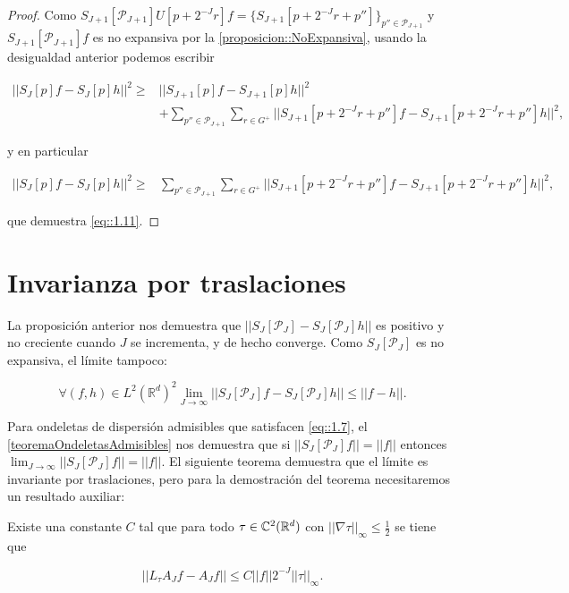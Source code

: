 \begin{proof}
\noindent Como $S_{J+1}[\mathcal{P}_{J+1}]U[p+2^{-J}r]f=\lbrace S_{J+1} [p+2^{-J}r+p'']\rbrace_{p''\in\mathcal{P}_{J+1}}$  y $S_{J+1}[\mathcal{P}_{J+1}]f$ es no expansiva por la \autoref{proposicion::NoExpansiva}, usando la desigualdad anterior podemos escribir

\begin{align*}
    ||S_{J}[p]f - S_J[p]h||^2 \geq & ||S_{J+1}[p]f-S_{J+1}[p]h||^2 \\
    & + \sum_{p''\in \mathcal{P}_{J+1}} \sum_{r\in G^+} || S_{J+1}[p+2^{-J}r+p'']f- S_{J+1}[p+2^{-J}r+p'']h||^2,
\end{align*}

\noindent y en particular

\begin{align*}
  ||S_{J}[p]f - S_J[p]h||^2 \geq & \sum_{p''\in \mathcal{P}_{J+1}} \sum_{r\in G^+} || S_{J+1}[p+2^{-J}r+p'']f- S_{J+1}[p+2^{-J}r+p'']h||^2,
\end{align*}

\noindent que demuestra \eqref{eq::1.11}. \qedhere
\end{proof}


\section{Invarianza por traslaciones}

\noindent La proposición anterior nos demuestra que $||S_J[\mathcal{P}_J]-S_J[\mathcal{P}_J]h||$ es positivo y no creciente cuando $J$ se incrementa, y de hecho converge. Como $S_J[\mathcal{P}_J]$ es no expansiva, el límite tampoco: 

$$\forall (f,h)\in L^2(\mathbb{R}^d)^2 \lim_{J\rightarrow\infty} ||S_J[\mathcal{P}_J]f-S_{J}[\mathcal{P}_J]h|| \leq ||f-h||.$$

\medskip

\noindent Para ondeletas de dispersión admisibles que satisfacen \eqref{eq::1.7}, el \autoref{teoremaOndeletasAdmisibles} nos demuestra que si $||S_J[\mathcal{P}_J]f||=||f||$ entonces $\lim_{J\rightarrow\infty}||S_J[\mathcal{P}_J]f||=||f||$. El siguiente teorema demuestra que el límite es invariante por traslaciones, pero para la demostración del teorema necesitaremos un resultado auxiliar: 

\begin{lema} \label{lema::constante}
  Existe una constante $C$ tal que para todo $\tau \in \mathbb{C}^2(\mathbb{R}^d)$ con $||\nabla \tau ||_\infty \leq \frac{1}{2}$ se tiene que 
  
  $$||L_\tau A_J f - A_J f|| \leq C ||f||2^{-J}||\tau||_{\infty}.$$
\end{lema}

